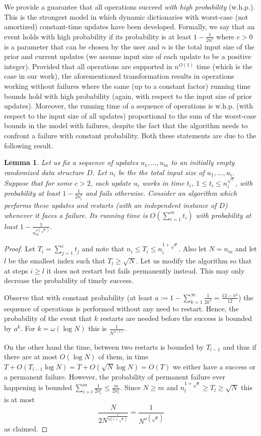 \documentclass[a4paper]{article}
\newtheorem{lemma}[theorem]{Lemma}
\theoremstyle{remark}
\begin{document}
We provide a guarantee that all operations succeed \emph{with high probability} (w.h.p.).
This is the strongest model in which dynamic dictionaries with worst-case (not amortized) constant-time updates have been developed.
Formally, we say that an event holds with high probability if its probability is at least $1-\frac{1}{2n^c}$ where $c>0$ is a parameter that can be chosen by the user and $n$ is the total input size of the prior and current updates (we assume input size of each update to be a positive integer).
Provided that all operations are supported in $n^{O(1)}$ time (which is the case in our work),
the aforementioned transformation results in operations working without failures where the same (up to a constant factor)
running time bounds hold with high probability (again, with respect to the input size of prior updates).
Moreover, the running time of a sequence of operations is w.h.p. (with respect to the input size of all updates)
proportional to the sum of the worst-case bounds in the model with failures, despite the fact that the algorithm needs to confront a failure with constant probability. Both these statements are due to the following result.
\begin{lemma}\label{lem:restart}
Let us fix a sequence of updates $u_1,\ldots,u_m$ to an initially empty randomized data structure $D$.
Let $n_i$ be the the total input size of $u_1,\ldots,u_i$. Suppose that for some $c>2$, each update $u_i$ works in time $t_i$, $1\le t_i \le n_i^{\sqrt{c}}$, with probability
at least $1-\frac{1}{2n_i^c}$ and fails otherwise.
Consider an algorithm which performs these updates and restarts (with an independent instance of $D$) whenever it faces a failure.
Its running time is $O(\sum_{i=1}^m t_i)$ with probability at least $1-\frac{1}{n_m^{\omega(\sqrt{c})}}$.
\end{lemma}
\begin{proof}
Let $T_i=\sum_{j=1}^i t_j$ and note that $n_i \le T_i\le n_i^{1+\sqrt{c}}$.
Also let $N=n_m$ and let $l$ be the smallest index such that $T_l \ge \sqrt{N}$.
Let us modify the algorithm so that at steps $i\ge l$  it does not restart but fails permanently instead.
This may only decrease the probability of timely success.

Observe that with constant probability (at least $a := 1-\sum_{k=1}^\infty \frac{1}{2k^2}=\frac{12-\pi^2}{12}$)
the sequence of operations is performed without any need to restart.
Hence, the probability of the event that $k$ restarts are needed before the success is bounded by $a^k$. For $k=\omega(\log N)$
this is $\frac{1}{N^{\omega(1)}}$.

On the other hand the time, between two restarts is bounded by $T_{l-1}$ and thus if there are at most $O(\log N)$ of them,
in time $T+O(T_{l-1}\log N)=T+O(\sqrt{N}\log N)=O(T)$ we either have a success or a permanent failure.
However, the probability of permanent failure ever happening is bounded $\sum_{i=l}^m \frac{1}{2n_i^c} \le \frac{m}{2n_l^c}$.
Since $N\ge m$ and $n_l^{1+\sqrt{c}} \ge T_l \ge \sqrt{N}$ this is at most
$$\frac{N}{2N^{\frac{c}{2(1+\sqrt{c})}}} =\frac{1}{N^{\omega(\sqrt{c})}}$$
as claimed.
\end{proof}
\end{document}
